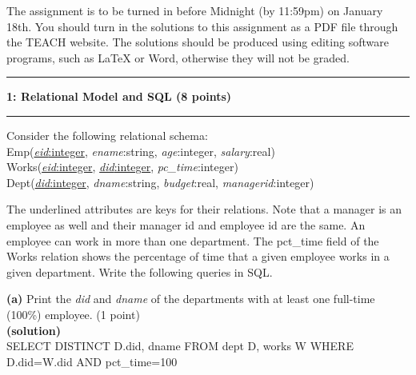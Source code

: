 \documentclass[11pt]{article}
\newcommand\question[2]{\vspace{.25in}\hrule\textbf{#1: #2}\vspace{.5em}\hrule\vspace{.10in}}
\renewcommand\part[1]{\vspace{.10in}\textbf{(#1)}}
\begin{document}
\raggedright
\newcommand\NAME{Nicholas Jake Jeffreys}  %
\newcommand\ANDREWID{932-221-702}     %
\newcommand\HWNUM{1}              %

The assignment is to be turned in before Midnight (by 11:59pm) on January 18th. You should turn in the solutions to this assignment as a PDF file through the TEACH website. The solutions should be produced using editing software programs, such as LaTeX or Word, otherwise they will not be graded.

\question{1}{Relational Model and SQL (8 points)}
Consider the following relational  schema:\\

Emp(\underline{{\it eid}:integer}, {\it ename}:string, {\it age}:integer, {\it salary}:real)\\
Works(\underline{{\it eid}:integer}, \underline{{\it did}:integer}, {\it pc\_time}:integer)\\
Dept(\underline{{\it did}:integer}, {\it dname}:string, {\it budget}:real, {\it managerid}:integer)\\
\vspace{10pt}

The underlined attributes are keys for their relations.
Note that a manager is an employee as well and their manager id and employee id are the same.
An employee can work in more than one department.
The pct\_time field of the Works relation shows the percentage of time that a given employee works in a given department.
Write the following queries in SQL.


\part{a} Print the {\it did} and {\it dname} of the departments with at least one full-time (100\%) employee. (1 point)\\
\part{solution}\\
SELECT DISTINCT D.did, dname FROM dept D, works W WHERE D.did=W.did AND pct\_time=100
\end{document}
